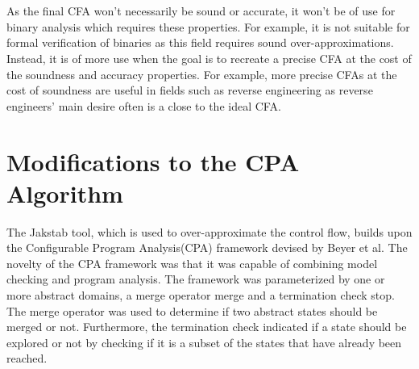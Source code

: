 \documentclass{kththesis}
\newcommand{\fbcomment}[1]{{#1}}
\renewcommand{\fbcomment}[1]{}
\begin{document}
\\ \\
As the final CFA won't necessarily be sound or accurate, it won't be of use for binary analysis which requires these properties. For example, it is not suitable for formal verification of binaries as this field requires sound over-approximations. Instead, it is of more use when the goal is to recreate a precise CFA at the cost of the soundness and accuracy properties. For example, more precise CFAs at the cost of soundness are useful in fields such as reverse engineering as reverse engineers' main desire often is a close to the ideal CFA.

\section{Modifications to the CPA Algorithm}\label{sec:modsToCPA}
\fbcomment{\color{red}Goal: Describe the origin of the CPA Algorithm and why it has morphed into the CPA+ algorithm and Jakstab algorithm. Additionally, explain how and why it was changed in this thesis.}
The Jakstab tool, which is used to over-approximate the control flow, builds upon the Configurable Program Analysis(CPA) framework devised by Beyer et al\cite{cpaAlgo}. The novelty of the CPA framework was that it was capable of combining model checking and program analysis. The framework was parameterized by one or more abstract domains, a merge operator merge and a termination check stop. The merge operator was used to determine if two abstract states should be merged or not. Furthermore, the termination check indicated if a state should be explored or not by checking if it is a subset of the states that have already been reached.
\end{document}
